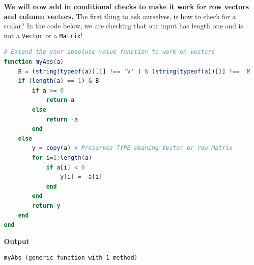\textbf{We will now add in conditional checks to make it work for row vectors and column vectors.} The first thing to ask ourselves, is how to check for a scalar? In the code below, we are checking that our input has length one and is not a \texttt{Vector} or a \texttt{Matrix}! \\



\begin{lstlisting}[language=Julia,style=mystyle]
# Extend the your absolute value function to work on vectors
function myAbs(a)
    B = (string(typeof(a))[1] !== 'V' ) & (string(typeof(a))[1] !== 'M' )
    if (length(a) == 1) & B
        if a >= 0 
            return a
        else
            return -a
        end
    else
        y = copy(a) # Preserves TYPE meaning Vector or row Matrix
        for i=1:length(a)
            if a[i] < 0
                y[i] = -a[i]
            end
        end
        return y
    end
end
\end{lstlisting}
\textbf{Output} 
\begin{verbatim}
myAbs (generic function with 1 method)
\end{verbatim}

